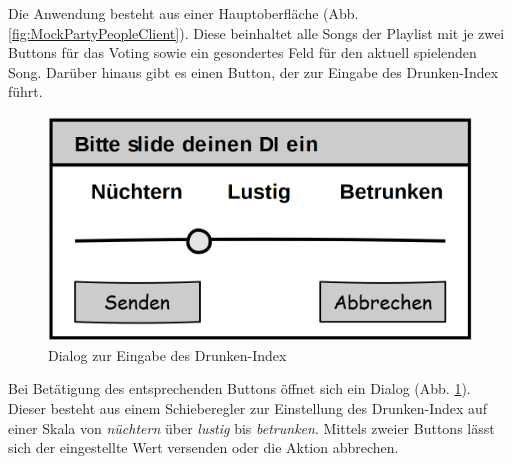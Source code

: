 Die Anwendung besteht aus einer Hauptoberfläche (Abb. \ref{fig:MockPartyPeopleClient}). Diese beinhaltet alle Songs der Playlist mit je zwei Buttons für das Voting sowie ein gesondertes Feld für den aktuell spielenden Song. Darüber hinaus gibt es einen Button, der zur Eingabe des Drunken-Index führt.

\begin{figure}[H]
\centering
\includegraphics[width=0.45\linewidth]{Bilder/MockDiSlider}
\caption{Dialog zur Eingabe des Drunken-Index}
\label{fig:MockDiSlider}
\end{figure}

Bei Betätigung des entsprechenden Buttons öffnet sich ein Dialog (Abb. \ref{fig:MockDiSlider}). Dieser besteht aus einem Schieberegler zur Einstellung des Drunken-Index auf einer Skala von \textit{nüchtern} über \textit{lustig} bis \textit{betrunken}. Mittels zweier Buttons lässt sich der eingestellte Wert versenden oder die Aktion abbrechen.